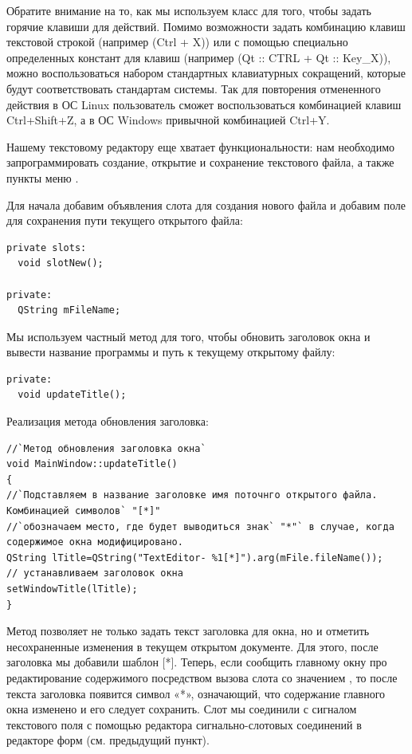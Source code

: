 Обратите внимание на то, как мы используем класс   
для того, чтобы задать
горячие клавиши для действий. Помимо возможности задать комбинацию клавиш текстовой строкой 
(например  (Ctrl + X)) или с помощью специально определенных констант для 
клавиш (например  (Qt :: CTRL + Qt :: Key\_X)), можно воспользоваться 
набором стандартных клавиатурных сокращений, которые будут соответствовать стандартам системы. 
Так для повторения отмененного действия в ОС Linux пользователь сможет воспользоваться комбинацией
клавиш Ctrl+Shift+Z, а в ОС Windows привычной комбинацией Ctrl+Y. 

Нашему текстовому редактору еще хватает функциональности: нам необходимо запрограммировать создание, открытие и
сохранение текстового файла, а также пункты меню .

Для начала добавим объявления слота для создания нового файла и добавим поле для сохранения пути текущего открытого
файла: 
\begin{lstlisting}
private slots:
  void slotNew();

private:
  QString mFileName;
\end{lstlisting}

Мы используем частный метод  для того, чтобы обновить заголовок окна и вывести название 
программы и путь к текущему открытому файлу: 
\begin{lstlisting}
private:
  void updateTitle();
\end{lstlisting}

Реализация метода обновления заголовка: 
\begin{lstlisting}
//`Метод обновления заголовка окна`
void MainWindow::updateTitle()
{
//`Подставляем в название заголовке имя поточнго открытого файла. Комбинацией символов` "[*]" 
//`обозначаем место, где будет выводиться знак` "*"` в случае, когда содержимое окна модифицировано.
QString lTitle=QString("TextEditor- %1[*]").arg(mFile.fileName());
// устанавливаем заголовок окна 
setWindowTitle(lTitle);
}
\end{lstlisting}


Метод  позволяет не только задать текст заголовка для окна, 
но и отметить несохраненные изменения в
текущем открытом документе. Для этого, после заголовка мы добавили шаблон [*]. 
Теперь, если сообщить главному окну про
редактирование содержимого посредством вызова слота  
со значением , то после текста
заголовка появится символ «*», означающий, что содержание главного окна изменено 
и его следует сохранить. Слот
 мы соединили с сигналом  
текстового поля  с помощью
редактора сигнально-слотовых соединений в редакторе форм (см. предыдущий пункт). 

